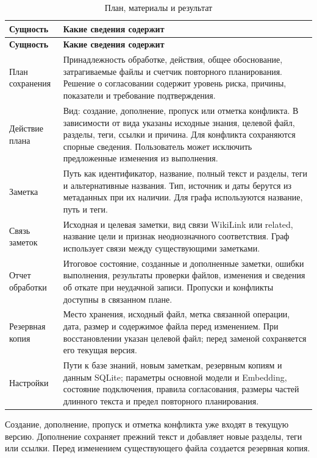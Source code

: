 {\small\setlength{\tabcolsep}{5pt}\renewcommand{\arraystretch}{1.12}
\begin{longtable}{L{34mm}L{\dimexpr{}\tabcolsep-34mm\relax}}
\caption{План, материалы и результат}\\
\toprule
\textbf{Сущность} & \textbf{Какие сведения содержит} \\
\midrule\endfirsthead
\toprule
\textbf{Сущность} & \textbf{Какие сведения содержит} \\
\midrule\endhead
\bottomrule\endfoot
План сохранения & Принадлежность обработке, действия, общее обоснование, затрагиваемые файлы и счетчик повторного планирования. Решение о согласовании содержит уровень риска, причины, показатели и требование подтверждения. \\[6pt]
Действие плана & Вид: создание, дополнение, пропуск или отметка конфликта. В зависимости от вида указаны исходные знания, целевой файл, разделы, теги, ссылки и причина. Для конфликта сохраняются спорные сведения. Пользователь может исключить предложенные изменения из выполнения. \\[6pt]
Заметка & Путь как идентификатор, название, полный текст и разделы, теги и альтернативные названия. Тип, источник и даты берутся из метаданных при их наличии. Для графа используются название, путь и теги. \\[6pt]
Связь заметок & Исходная и целевая заметки, вид связи WikiLink или related, название цели и признак неоднозначного соответствия. Граф использует связи между существующими заметками. \\[6pt]
Отчет обработки & Итоговое состояние, созданные и дополненные заметки, ошибки выполнения, результаты проверки файлов, изменения и сведения об откате при неудачной записи. Пропуски и конфликты доступны в связанном плане. \\[6pt]
Резервная копия & Место хранения, исходный файл, метка связанной операции, дата, размер и содержимое файла перед изменением. При восстановлении указан целевой файл; перед заменой сохраняется его текущая версия. \\[6pt]
Настройки & Пути к базе знаний, новым заметкам, резервным копиям и данным SQLite; параметры основной модели и Embedding, состояние подключения, правила согласования, размеры частей длинного текста и предел повторного планирования. \\[6pt]
\end{longtable}}

Создание, дополнение, пропуск и отметка конфликта уже входят в текущую версию. Дополнение сохраняет прежний текст и добавляет новые разделы, теги или ссылки. Перед изменением существующего файла создается резервная копия.


